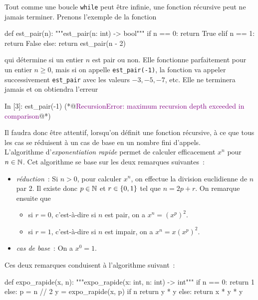 \documentclass{magnoliaold}
\begin{document}
\vspace{2ex}
Tout comme une boucle \verb!while! peut être infinie, une fonction récursive peut
ne jamais terminer. Prenons l'exemple de la fonction
\begin{pythoncodeline}
def est_pair(n):
    """est_pair(n: int) -> bool"""
    if n == 0:
        return True
    elif n == 1:
        return False
    else:
        return est_pair(n - 2)
\end{pythoncodeline}
\noindent
qui détermine si un entier $n$ est pair ou non. Elle fonctionne parfaitement pour
un entier $n\geq 0$, mais si on appelle \verb!est_pair(-1)!, la fonction
va appeler successivement \verb!est_pair! avec les valeurs $-3,-5,-7$, etc. Elle
ne terminera jamais et on obtiendra l'erreur
\begin{pythoncode}
In [3]: est_pair(-1)
(*@\textcolor{purple}{RecursionError: maximum recursion depth exceeded in comparison}@*)
\end{pythoncode}
Il faudra donc être attentif, lorsqu'on définit une fonction récursive, à ce que
tous les cas se réduisent à un cas de base en un nombre fini d'appels.\\


L'algorithme d'\emph{exponentiation rapide} permet de calculer efficacement $x^n$ pour $n\in\mathbb{N}$. Cet
algorithme se base sur les deux remarques suivantes~:
\begin{itemize}
\item \emph{réduction}~: Si $n>0$, pour calculer $x^n$, on effectue la division
  euclidienne de $n$ par 2. Il existe donc $p\in\mathbb{N}$ et $r\in\left\{0,1\right\}$ tel que $n=2p+r$.
  On remarque ensuite que
\begin{itemize}
\item si $r=0$, c'est-à-dire si $n$ est pair, on a $x^n=(x^p)^2$.
\item si $r=1$, c'est-à-dire si $n$ est impair, on a $x^n=x(x^p)^2$. 
\end{itemize}
\item \emph{cas de base}~: On a $x^0=1$.
\end{itemize}
Ces deux remarques conduisent à l'algorithme suivant~:
\begin{pythoncodeline}
def expo_rapide(x, n):
    """expo_rapide(x: int, n: int) -> int"""
    if n == 0:
        return 1
    else:
        p = n // 2
        y = expo_rapide(x, p)
        if n %
            return y * y
        else:
            return x * y * y
\end{pythoncodeline}
\end{document}
